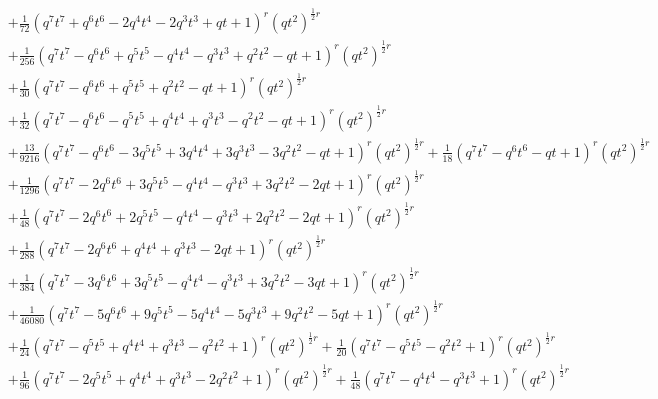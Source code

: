 \documentclass[11pt,english]{amsart}
\numberwithin{equation}{section}
\numberwithin{figure}{section}
\theoremstyle{plain}
\theoremstyle{plain}
\theoremstyle{definition}
\theoremstyle{remark}
\begin{document}
{\begin{align*}
& + \frac{1}{72}  {\left(q^{7} t^{7} + q^{6} t^{6} - 2  q^{4} t^{4} - 2  q^{3} t^{3} + q t + 1\right)}^{r} \left(q t^{2}\right)^{\frac{1}{2}  r} \\
& + \frac{1}{256}  {\left(q^{7} t^{7} - q^{6} t^{6} + q^{5} t^{5} - q^{4} t^{4} - q^{3} t^{3} + q^{2} t^{2} - q t + 1\right)}^{r} \left(q t^{2}\right)^{\frac{1}{2}  r} \\
& + \frac{1}{30}  {\left(q^{7} t^{7} - q^{6} t^{6} + q^{5} t^{5} + q^{2} t^{2} - q t + 1\right)}^{r} \left(q t^{2}\right)^{\frac{1}{2}  r} \\
& + \frac{1}{32}  {\left(q^{7} t^{7} - q^{6} t^{6} - q^{5} t^{5} + q^{4} t^{4} + q^{3} t^{3} - q^{2} t^{2} - q t + 1\right)}^{r} \left(q t^{2}\right)^{\frac{1}{2}  r} \\
& + \frac{13}{9216}  {\left(q^{7} t^{7} - q^{6} t^{6} - 3  q^{5} t^{5} + 3  q^{4} t^{4} + 3  q^{3} t^{3} - 3  q^{2} t^{2} - q t + 1\right)}^{r} \left(q t^{2}\right)^{\frac{1}{2}  r} + \frac{1}{18}  {\left(q^{7} t^{7} - q^{6} t^{6} - q t + 1\right)}^{r} \left(q t^{2}\right)^{\frac{1}{2}  r} \\
& + \frac{1}{1296}  {\left(q^{7} t^{7} - 2  q^{6} t^{6} + 3  q^{5} t^{5} - q^{4} t^{4} - q^{3} t^{3} + 3  q^{2} t^{2} - 2  q t + 1\right)}^{r} \left(q t^{2}\right)^{\frac{1}{2}  r} \\
& + \frac{1}{48}  {\left(q^{7} t^{7} - 2  q^{6} t^{6} + 2  q^{5} t^{5} - q^{4} t^{4} - q^{3} t^{3} + 2  q^{2} t^{2} - 2  q t + 1\right)}^{r} \left(q t^{2}\right)^{\frac{1}{2}  r} \\
& + \frac{1}{288}  {\left(q^{7} t^{7} - 2  q^{6} t^{6} + q^{4} t^{4} + q^{3} t^{3} - 2  q t + 1\right)}^{r} \left(q t^{2}\right)^{\frac{1}{2}  r} \\
& + \frac{1}{384}  {\left(q^{7} t^{7} - 3  q^{6} t^{6} + 3  q^{5} t^{5} - q^{4} t^{4} - q^{3} t^{3} + 3  q^{2} t^{2} - 3  q t + 1\right)}^{r} \left(q t^{2}\right)^{\frac{1}{2}  r} \\
& + \frac{1}{46080}  {\left(q^{7} t^{7} - 5  q^{6} t^{6} + 9  q^{5} t^{5} - 5  q^{4} t^{4} - 5  q^{3} t^{3} + 9  q^{2} t^{2} - 5  q t + 1\right)}^{r} \left(q t^{2}\right)^{\frac{1}{2}  r} \\
& + \frac{1}{24}  {\left(q^{7} t^{7} - q^{5} t^{5} + q^{4} t^{4} + q^{3} t^{3} - q^{2} t^{2} + 1\right)}^{r} \left(q t^{2}\right)^{\frac{1}{2}  r} + \frac{1}{20}  {\left(q^{7} t^{7} - q^{5} t^{5} - q^{2} t^{2} + 1\right)}^{r} \left(q t^{2}\right)^{\frac{1}{2}  r} \\
& + \frac{1}{96}  {\left(q^{7} t^{7} - 2  q^{5} t^{5} + q^{4} t^{4} + q^{3} t^{3} - 2  q^{2} t^{2} + 1\right)}^{r} \left(q t^{2}\right)^{\frac{1}{2}  r} + \frac{1}{48}  {\left(q^{7} t^{7} - q^{4} t^{4} - q^{3} t^{3} + 1\right)}^{r} \left(q t^{2}\right)^{\frac{1}{2}  r} \\

\end{align*}}
\end{document}
